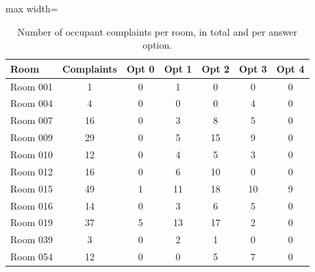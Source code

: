 \begin{table}[ht]
\centering
\begin{adjustbox}{max width=\textwidth}
\begin{tabular}{lcccccc}
\hline
Room & Complaints & Opt 0 & Opt 1 & Opt 2 & Opt 3 & Opt 4 \\
\hline
Room 001 & 1 & 0 & 1 & 0 & 0 & 0 \\
Room 004 & 4 & 0 & 0 & 0 & 4 & 0 \\
Room 007 & 16 & 0 & 3 & 8 & 5 & 0 \\
Room 009 & 29 & 0 & 5 & 15 & 9 & 0 \\
Room 010 & 12 & 0 & 4 & 5 & 3 & 0 \\
Room 012 & 16 & 0 & 6 & 10 & 0 & 0 \\
Room 015 & 49 & 1 & 11 & 18 & 10 & 9 \\
Room 016 & 14 & 0 & 3 & 6 & 5 & 0 \\
Room 019 & 37 & 5 & 13 & 17 & 2 & 0 \\
Room 039 & 3 & 0 & 2 & 1 & 0 & 0 \\
Room 054 & 12 & 0 & 0 & 5 & 7 & 0 \\
\hline
\end{tabular}
\end{adjustbox}
\caption{Number of occupant complaints per room, in total and per answer option.}
\label{tab:feedback_counts}
\end{table}
